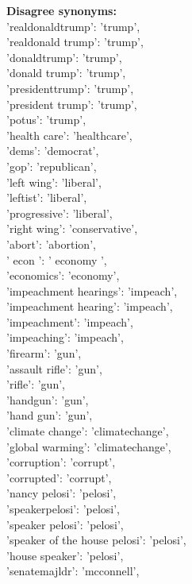 \documentclass[../embeddings.tex]{subfiles}
\begin{document}
\textbf{Disagree synonyms:}\\
    'realdonaldtrump': 'trump',\\
    'realdonald trump': 'trump',\\
    'donaldtrump': 'trump',\\
    'donald trump': 'trump',\\
    'presidenttrump': 'trump',\\
    'president trump': 'trump',\\
    'potus': 'trump',\\
    'health care': 'healthcare',\\
    'dems': 'democrat',\\
    'gop': 'republican',\\
    'left wing': 'liberal',\\
    'leftist': 'liberal',\\
    'progressive': 'liberal',\\
    'right wing': 'conservative',\\
    'abort': 'abortion',\\
    ' econ ': ' economy ',\\
    'economics': 'economy',\\
    'impeachment hearings': 'impeach',\\
    'impeachment hearing': 'impeach',\\
    'impeachment': 'impeach',\\
    'impeaching': 'impeach',\\
    'firearm': 'gun',\\
    'assault rifle': 'gun',\\
    'rifle': 'gun',\\
    'handgun': 'gun',\\
    'hand gun': 'gun',\\
    'climate change': 'climatechange',\\
    'global warming': 'climatechange',\\
    'corruption': 'corrupt',\\
    'corrupted': 'corrupt',\\
    'nancy pelosi': 'pelosi',\\
    'speakerpelosi': 'pelosi',\\
    'speaker pelosi': 'pelosi',\\
    'speaker of the house pelosi': 'pelosi',\\
    'house speaker': 'pelosi',\\
    'senatemajldr': 'mcconnell',\\
\end{document}
